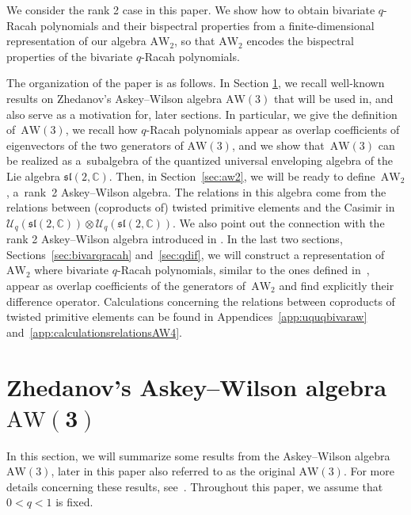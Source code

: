 \documentclass[10pt,a4paper]{amsart}
\numberwithin{equation}{section}
\newcommand{\CC}{\mathbb{C}}
\newcommand{\aw}{\mathrm{AW}\!\left(3\right)}
\newcommand{\AW}[1]{\mathrm{AW}_{#1}}
\newcommand{\slc}{\mathfrak{sl}(2,\CC)}
\newcommand{\uql}[1][q]{\mathcal{U}_{#1}(\mathfrak{sl}(2,\CC))}
\begin{document}
We consider the rank 2 case in this paper. We show how to obtain bivariate $q$-Racah polynomials and their bispectral properties from a finite-dimensional representation of our algebra $\AW{2}$, so that $\AW{2}$ encodes the bispectral properties of the bivariate $q$-Racah polyno\-mials.

The organization of the paper is as follows. In Section \ref{sec:aw}, we recall well-known results on Zhedanov's Askey--Wilson algebra $\aw$ that will be used in, and also serve as a motivation for, later sections. In particular, we give the definition of~$\aw$, we recall how $q$-Racah polynomials appear as overlap coefficients of eigenvectors of the two generators of $\aw$, and we show that~$\aw$ can be realized as a~subalgebra of the quantized universal enveloping algebra of the Lie algebra $\slc$. Then, in Section~\ref{sec:aw2}, we will be ready to define~$\AW{2}$, a~rank~2 Askey--Wilson algebra. The relations in this algebra come from the relations between (coproducts of) twisted primitive elements and the Casimir in $\uql\otimes \uql$. We also point out the connection with the rank 2 Askey--Wilson algebra introduced in \cite{DeBie2020}. In the last two sections, Sections~\ref{sec:bivarqracah} and~\ref{sec:qdif}, we will construct a representation of~$\AW{2}$ where bivariate $q$-Racah polynomials, similar to the ones defined in~\cite{Gasper2007}, appear as overlap coefficients of the generators of~$\AW{2}$ and find explicitly their difference operator. Calculations concerning the relations between coproducts of twisted primitive elements can be found in Appendices~\ref{app:uquqbivaraw} and~\ref{app:calculationsrelationsAW4}.

\section[Zhedanov's Askey--Wilson algebra AW(3)]{Zhedanov's Askey--Wilson algebra $\boldsymbol{\aw}$}\label{sec:aw}

In this section, we will summarize some results from the Askey--Wilson algebra $\aw$, later in this paper also referred to as the original $\aw$. For more details concerning these results, see~\cite{Zhedanov1991}. Throughout this paper, we assume that $0<q<1$ is fixed.
\end{document}
